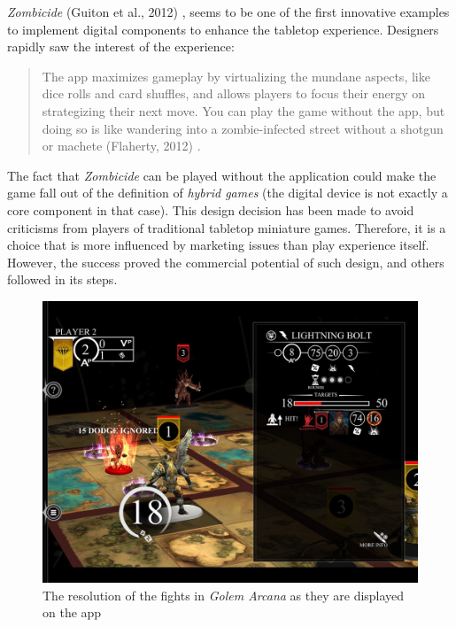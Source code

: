 \textit{Zombicide} (Guiton et al., 2012) \cite{game:zombi}, seems to be one of the first innovative examples to implement digital components to enhance the tabletop experience. Designers rapidly saw the interest of the experience:

\begin{quotation}
The app maximizes gameplay by virtualizing the mundane aspects, like dice rolls and card shuffles, and allows players to focus their energy on strategizing their next move. You can play the game without the app, but doing so is like wandering into a zombie-infected street without a shotgun or machete (Flaherty, 2012) \cite{web:wired}.
\end{quotation}

The fact that \textit{Zombicide} can be played without the application could make the game fall out of the definition of \textit{hybrid games} (the digital device is not exactly a core component in that case). This design decision has been made to avoid criticisms from players of traditional tabletop miniature games. Therefore, it is a choice that is more influenced by marketing issues than play experience itself. However, the success proved the commercial potential of such design, and others followed in its steps.

\begin{figure}[!ht]
    \centering
    \includegraphics[scale=0.2]{Images/golem_app.jpg}
    \caption{The resolution of the fights in \textit{Golem Arcana} as they are displayed on the app}
    \label{fig:Golem}
\end{figure}

